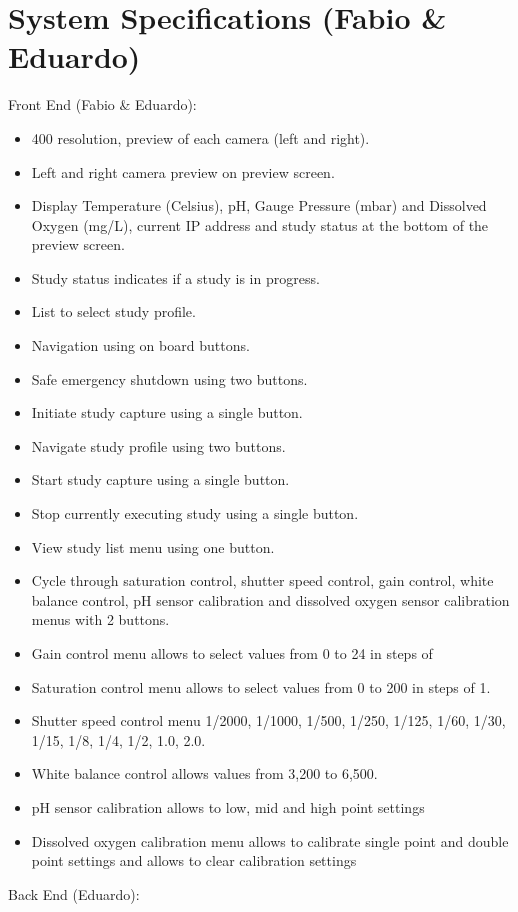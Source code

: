 \section{System Specifications (Fabio \& Eduardo)}
Front End (Fabio \& Eduardo):
\begin{itemize}
	\item 400 resolution, preview of each camera (left and right).
	\item Left and right camera preview on preview screen.
	\item Display Temperature (Celsius), pH, Gauge Pressure (mbar) and Dissolved Oxygen (mg/L), current IP address and study status at the bottom of the preview screen.
	\item Study status indicates if a study is in progress.
	\item List to select study profile.
	\item Navigation using on board buttons.
	\item Safe emergency shutdown using two buttons.
	\item Initiate study capture using a single button.
	\item Navigate study profile using two buttons.
	\item Start study capture using a single button.
	\item Stop currently executing study using a single button.
	\item View study list menu using one button.
	\item Cycle through saturation control, shutter speed control, gain control, white balance control, pH sensor calibration and dissolved oxygen sensor calibration menus with 2 buttons.
	\item Gain control menu allows to select values from 0 to 24 in steps of
	\item Saturation control menu allows to select values from 0 to 200 in steps of 1.
	\item Shutter speed control menu 1/2000, 1/1000, 1/500, 1/250, 1/125, 1/60, 1/30, 1/15, 1/8, 1/4, 1/2, 1.0, 2.0.
	\item White balance control allows values from 3,200 to 6,500.
	\item pH sensor calibration allows to low, mid and high point settings
	\item Dissolved oxygen calibration menu allows to calibrate single point and double point settings and allows to clear calibration settings
\end{itemize}
Back End (Eduardo):
